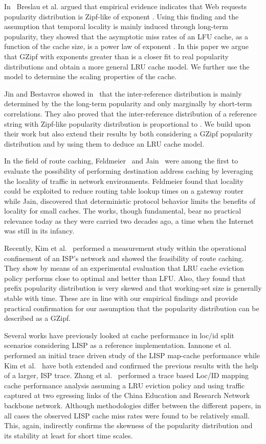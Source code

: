 \documentclass[twocolumn, 10pt]{article}
\theoremstyle{plain}
\begin{document}
In~\cite{breslau:web_and_zipf} Breslau et al. argued that empirical evidence
indicates that Web requests popularity distribution is Zipf-like of exponent
. Using this finding and the assumption that temporal locality is
mainly induced through long-term popularity, they showed that the asymptotic
miss rates of an LFU cache, as a function of the cache size, is a power law of
exponent . In this paper we argue that GZipf with exponents greater
than  is a closer fit to real popularity distributions and obtain a more
general LRU cache model. We further use the model to determine the scaling
properties of the cache. 

Jin and Bestavros showed in~\cite{jin:web_tloc} that the inter-reference
distribution is mainly determined by the the long-term popularity and only
marginally by short-term correlations. They also proved that the
inter-reference distribution of a reference string with Zipf-like popularity
distribution is proportional to . We build upon their work
but also extend their results by both considering a GZipf popularity
distribution and by using them to deduce an LRU cache model. 

In the field of route caching, Feldmeier~\cite{feldmeier:rt_cache} and
Jain~\cite{jain:dst_locality} were among the first to evaluate the possibility
of performing destination address caching by leveraging the locality of
traffic in network environments. Feldmeier found that locality could be
exploited to reduce routing table lookup times on a gateway router while Jain,
discovered that deterministic protocol behavior limits the benefits of
locality for small caches. The works, though fundamental, bear no practical
relevance today as they were carried two decades ago, a time when the Internet
was still in its infancy. 

Recently, Kim et al.~\cite{kim:rcaching} performed a measurement study within
the operational confinement of an ISP's network and showed the feasibility of
route caching. They show by means of an experimental evaluation that LRU cache
eviction policy performs close to optimal and better than LFU. Also, they
found  that prefix popularity distribution is very skewed and that working-set
size is generally stable with time. These are in line with our empirical
findings and provide practical confirmation for our assumption that the
popularity distribution can be described as a GZipf. 

Several works have previously looked at cache performance in loc/id split
scenarios considering LISP as a reference implementation. Iannone et
al.~\cite{iannone:lcache} performed an initial trace driven study of the LISP
map-cache performance while Kim et al.~\cite{jkim:lcache} have both extended
and confirmed the previous results with the help of a larger, ISP trace.
Zhang et al.~\cite{zhang:lcache} performed a trace based Loc/ID mapping cache
performance analysis assuming a LRU eviction policy and using traffic captured
at two egressing links of the China Education and Research Network backbone
network. Although methodologies differ between the different papers, in all
cases the observed LISP cache miss rates were found to be relatively small.
This, again, indirectly confirms the skewness of the popularity distribution
and its stability at least for short time scales. 
\end{document}
